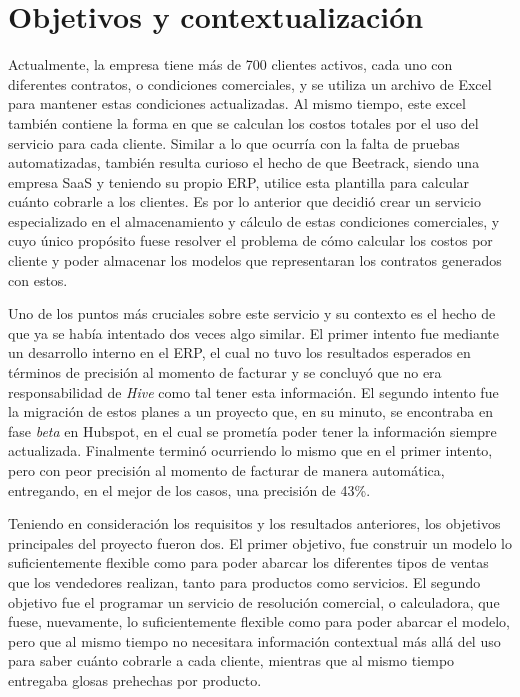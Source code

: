 \section{Objetivos y contextualización}

  Actualmente, la empresa tiene más de 700 clientes activos, cada uno con diferentes contratos, o condiciones comerciales, y se utiliza un archivo de Excel para mantener estas condiciones actualizadas. Al mismo tiempo, este excel también contiene la forma en que se calculan los costos totales por el uso del servicio para cada cliente. Similar a lo que ocurría con la falta de pruebas automatizadas, también resulta curioso el hecho de que Beetrack, siendo una empresa SaaS y teniendo su propio ERP, utilice esta plantilla para calcular cuánto cobrarle a los clientes. Es por lo anterior que decidió crear un servicio especializado en el almacenamiento y cálculo de estas condiciones comerciales, y cuyo único propósito fuese resolver el problema de cómo calcular los costos por cliente y poder almacenar los modelos que representaran los contratos generados con estos.
  
  Uno de los puntos más cruciales sobre este servicio y su contexto es el hecho de que ya se había intentado dos veces algo similar. El primer intento fue mediante un desarrollo interno en el ERP, el cual no tuvo los resultados esperados en términos de precisión al momento de facturar y se concluyó que no era responsabilidad de \textit{Hive} como tal tener esta información. El segundo intento fue la migración de estos planes a un proyecto que, en su minuto, se encontraba en fase \textit{beta} en Hubspot, en el cual se prometía poder tener la información siempre actualizada. Finalmente terminó ocurriendo lo mismo que en el primer intento, pero con peor precisión al momento de facturar de manera automática, entregando, en el mejor de los casos, una precisión de 43\%.

  Teniendo en consideración los requisitos y los resultados anteriores, los objetivos principales del proyecto fueron dos. El primer objetivo, fue construir un modelo lo suficientemente flexible como para poder abarcar los diferentes tipos de ventas que los vendedores realizan, tanto para productos como servicios. El segundo objetivo fue el programar un servicio de resolución comercial, o calculadora, que fuese, nuevamente, lo suficientemente flexible como para poder abarcar el modelo, pero que al mismo tiempo no necesitara información contextual más allá del uso para saber cuánto cobrarle a cada cliente, mientras que al mismo tiempo entregaba glosas prehechas por producto.

